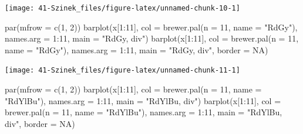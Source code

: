 \documentclass[
]{book}
\newenvironment{Shaded}{\begin{snugshade}}{\end{snugshade}}
\newcommand{\AttributeTok}[1]{\textcolor[rgb]{0.77,0.63,0.00}{#1}}
\newcommand{\ConstantTok}[1]{\textcolor[rgb]{0.00,0.00,0.00}{#1}}
\newcommand{\DecValTok}[1]{\textcolor[rgb]{0.00,0.00,0.81}{#1}}
\newcommand{\FunctionTok}[1]{\textcolor[rgb]{0.00,0.00,0.00}{#1}}
\newcommand{\NormalTok}[1]{#1}
\newcommand{\SpecialCharTok}[1]{\textcolor[rgb]{0.00,0.00,0.00}{#1}}
\newcommand{\StringTok}[1]{\textcolor[rgb]{0.31,0.60,0.02}{#1}}
\begin{document}
\begin{center}\texttt{[image: 41-Szinek\_files/figure-latex/unnamed-chunk-10-1]} \end{center}

\begin{Shaded}
\begin{Highlighting}[]
\FunctionTok{par}\NormalTok{(}\AttributeTok{mfrow =} \FunctionTok{c}\NormalTok{(}\DecValTok{1}\NormalTok{, }\DecValTok{2}\NormalTok{))}
\FunctionTok{barplot}\NormalTok{(x[}\DecValTok{1}\SpecialCharTok{:}\DecValTok{11}\NormalTok{], }\AttributeTok{col =} \FunctionTok{brewer.pal}\NormalTok{(}\AttributeTok{n =} \DecValTok{11}\NormalTok{, }\AttributeTok{name =} \StringTok{"RdGy"}\NormalTok{), }\AttributeTok{names.arg =} \DecValTok{1}\SpecialCharTok{:}\DecValTok{11}\NormalTok{, }
    \AttributeTok{main =} \StringTok{"RdGy, div"}\NormalTok{)}
\FunctionTok{barplot}\NormalTok{(x[}\DecValTok{1}\SpecialCharTok{:}\DecValTok{11}\NormalTok{], }\AttributeTok{col =} \FunctionTok{brewer.pal}\NormalTok{(}\AttributeTok{n =} \DecValTok{11}\NormalTok{, }\AttributeTok{name =} \StringTok{"RdGy"}\NormalTok{), }\AttributeTok{names.arg =} \DecValTok{1}\SpecialCharTok{:}\DecValTok{11}\NormalTok{, }
    \AttributeTok{main =} \StringTok{"RdGy, div"}\NormalTok{, }\AttributeTok{border =} \ConstantTok{NA}\NormalTok{)}
\end{Highlighting}
\end{Shaded}

\begin{center}\texttt{[image: 41-Szinek\_files/figure-latex/unnamed-chunk-11-1]} \end{center}

\begin{Shaded}
\begin{Highlighting}[]
\FunctionTok{par}\NormalTok{(}\AttributeTok{mfrow =} \FunctionTok{c}\NormalTok{(}\DecValTok{1}\NormalTok{, }\DecValTok{2}\NormalTok{))}
\FunctionTok{barplot}\NormalTok{(x[}\DecValTok{1}\SpecialCharTok{:}\DecValTok{11}\NormalTok{], }\AttributeTok{col =} \FunctionTok{brewer.pal}\NormalTok{(}\AttributeTok{n =} \DecValTok{11}\NormalTok{, }\AttributeTok{name =} \StringTok{"RdYlBu"}\NormalTok{), }\AttributeTok{names.arg =} \DecValTok{1}\SpecialCharTok{:}\DecValTok{11}\NormalTok{, }
    \AttributeTok{main =} \StringTok{"RdYlBu, div"}\NormalTok{)}
\FunctionTok{barplot}\NormalTok{(x[}\DecValTok{1}\SpecialCharTok{:}\DecValTok{11}\NormalTok{], }\AttributeTok{col =} \FunctionTok{brewer.pal}\NormalTok{(}\AttributeTok{n =} \DecValTok{11}\NormalTok{, }\AttributeTok{name =} \StringTok{"RdYlBu"}\NormalTok{), }\AttributeTok{names.arg =} \DecValTok{1}\SpecialCharTok{:}\DecValTok{11}\NormalTok{, }
    \AttributeTok{main =} \StringTok{"RdYlBu, div"}\NormalTok{, }\AttributeTok{border =} \ConstantTok{NA}\NormalTok{)}
\end{Highlighting}
\end{Shaded}
\end{document}
